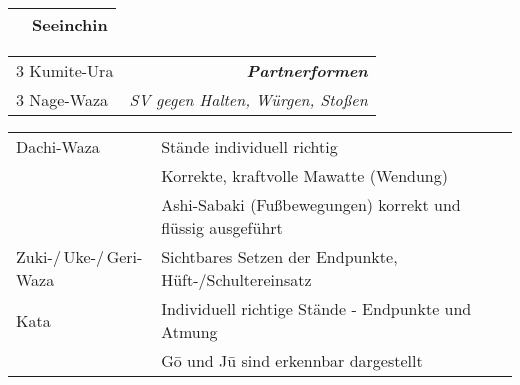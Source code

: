 \begin{tcolorbox}[width=\textwidth,height=\textheight,right=12pt,left=12pt,colframe=BLBELT,colback=white,fonttitle=\bfseries,coltitle=white,title=4. Kyu:\indent Kihon-Ido Kata - Partnerformen - Erwartungshorizont]
\begin{minipage}[t]{0.45\textwidth}
\begin{tabularx}{\textwidth}{cX}
			&Seeinchin \\
			\midrule
		\end{tabularx}
	\end{minipage}
	\null\hfill\null	%
	\begin{minipage}[t]{0.45\textwidth}
		\begin{tabularx}{\textwidth}{Xr}
			\midrule
			3 Kumite-Ura	&{\textbf{\textit{Partnerformen}}}\\
			3 Nage-Waza		&{\small \textit{SV gegen Halten, Würgen, Stoßen}} \\
			\midrule
		\end{tabularx}
	\end{minipage}
	\null\vfill\null
	\begin{center}
		{\small 		\begin{tabularx}{\textwidth}{ll}
				\midrule
				Dachi-Waza	&	Stände individuell richtig \\
				&	Korrekte, kraftvolle Mawatte (Wendung)\\
				&	Ashi-Sabaki (Fußbewegungen) korrekt und flüssig ausgeführt\\
				Zuki-/\,Uke-/\,Geri-Waza	&	Sichtbares Setzen der Endpunkte, Hüft-/Schultereinsatz\\
				Kata		&	Individuell richtige Stände - Endpunkte und Atmung\\
				&	G\={o} und J\={u} sind erkennbar dargestellt\\
				\midrule
		\end{tabularx}}\\\null\vfill\null
	\end{center}
\end{tcolorbox}	